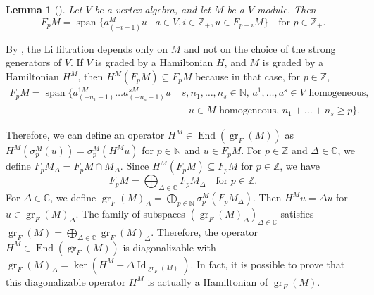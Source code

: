 \documentclass[a4paper, 12pt, reqno]{amsart}
\newtheorem{lemma}[theorem]{Lemma}
\theoremstyle{remark}
\DeclareMathOperator{\gr}{gr}
\DeclareMathOperator{\vspan}{span}
\DeclareMathOperator{\End}{End}
\DeclareMathOperator{\Id}{Id}
\begin{document}
\begin{lemma}[{\cite[Lemma 2.9]{li_abelianizing_2005}}]
  \label{lmm:5}
  Let $V$ be a vertex algebra, and let $M$ be a $V$-module.
  Then
  \begin{equation*}
    F_pM = \vspan\{a^M_{(-i - 1)}u \mid a \in V, i \in \mathbb{Z}_+, u \in F_{p - i}M\} \quad \text{for $p \in \mathbb{Z}_+$}.
  \end{equation*}
\end{lemma}

By , the Li filtration depends only on $M$ and not on the choice of the strong generators of $V$.
If $V$ is graded by a Hamiltonian $H$, and $M$ is graded by a Hamiltonian $H^M$, then $H^M(F_pM) \subseteq F_pM$ because in that case, for $p \in \mathbb{Z}$,
\begin{equation*}
  \begin{split}
    F_pM = \vspan\{a^{1M}_{(-n_1 - 1)}\dots a^{sM}_{(-n_s - 1)}u &\mid \text{$s, n_1, \dots, n_s \in \mathbb{N}$, $a^1, \dots, a^s \in V$ homogeneous,} \\
                                                                 &\quad \text{$u \in M$ homogeneous, $n_1 + \dots + n_s \ge p$}\}.
  \end{split}
\end{equation*}

Therefore, we can define an operator $H^M \in \End(\gr_F(M))$ as $H^M(\sigma^M_p(u)) = \sigma^M_p(H^Mu)$ for $p \in \mathbb{N}$ and $u \in F_pM$.
For $p \in \mathbb{Z}$ and $\Delta \in \mathbb{C}$, we define $F_pM_{\Delta} = F_pM \cap M_{\Delta}$.
Since $H^M(F_pM) \subseteq F_pM$ for $p \in \mathbb{Z}$, we have
\begin{equation*}
  F_pM = \bigoplus_{\Delta \in \mathbb{C}}F_pM_{\Delta} \quad \text{for $p \in \mathbb{Z}$}.
\end{equation*}
For $\Delta \in \mathbb{C}$, we define $\gr_F(M)_{\Delta} = \bigoplus_{p \in \mathbb{N}}\sigma^M_p(F_pM_{\Delta})$.
Then $H^Mu = \Delta u$ for $u \in \gr_F(M)_{\Delta}$.
The family of subspaces $(\gr_F(M)_{\Delta})_{\Delta \in \mathbb{C}}$ satisfies $\gr_F(M) = \bigoplus_{\Delta \in \mathbb{C}}\gr_F(M)_{\Delta}$.
Therefore, the operator $H^M \in \End(\gr_F(M))$ is diagonalizable with $\gr_F(M)_{\Delta} = \ker(H^M - \Delta\Id_{\gr_F(M)})$.
In fact, it is possible to prove that this diagonalizable operator $H^M$ is actually a Hamiltonian of $\gr_F(M)$.
\end{document}
